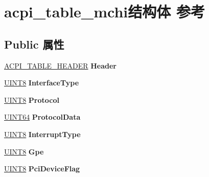 \hypertarget{structacpi__table__mchi}{}\section{acpi\+\_\+table\+\_\+mchi结构体 参考}
\label{structacpi__table__mchi}
\subsection*{Public 属性}
\begin{DoxyCompactItemize}
\item 
\mbox{\label{structacpi__table__mchi_a500c2c18ceb442c466a91e79088589ad}} 
\hyperlink{structacpi__table__header}{A\+C\+P\+I\+\_\+\+T\+A\+B\+L\+E\+\_\+\+H\+E\+A\+D\+ER} {\bfseries Header}
\item 
\mbox{\label{structacpi__table__mchi_a24c87f14c8e0db821e1744d7098b9870}} 
\hyperlink{_processor_bind_8h_ab27e9918b538ce9d8ca692479b375b6a}{U\+I\+N\+T8} {\bfseries Interface\+Type}
\item 
\mbox{\label{structacpi__table__mchi_aeef409e46c14ff8aad2a008bd18517c0}} 
\hyperlink{_processor_bind_8h_ab27e9918b538ce9d8ca692479b375b6a}{U\+I\+N\+T8} {\bfseries Protocol}
\item 
\mbox{\label{structacpi__table__mchi_a630f818c57a929b031912de3fcb8f921}} 
\hyperlink{_processor_bind_8h_a57be03562867144161c1bfee95ca8f7c}{U\+I\+N\+T64} {\bfseries Protocol\+Data}
\item 
\mbox{\label{structacpi__table__mchi_a32908feea8866bf25c22b80da41b77cd}} 
\hyperlink{_processor_bind_8h_ab27e9918b538ce9d8ca692479b375b6a}{U\+I\+N\+T8} {\bfseries Interrupt\+Type}
\item 
\mbox{\label{structacpi__table__mchi_a3dd57c0ea9090aa5efa391cbc0866b93}} 
\hyperlink{_processor_bind_8h_ab27e9918b538ce9d8ca692479b375b6a}{U\+I\+N\+T8} {\bfseries Gpe}
\item 
\mbox{\label{structacpi__table__mchi_aab6b7c0df927b561068c0ba569d7c991}} 
\hyperlink{_processor_bind_8h_ab27e9918b538ce9d8ca692479b375b6a}{U\+I\+N\+T8} {\bfseries Pci\+Device\+Flag}

\end{DoxyCompactItemize}
